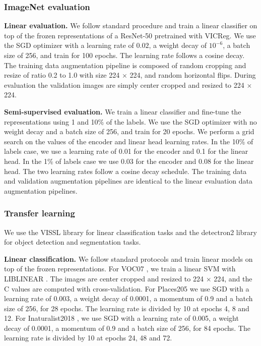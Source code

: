 \documentclass{article}
\newcommand{\algo}{VICReg}
\begin{document}
\subsubsection{ImageNet evaluation} \label{app:eval_imnet}

\textbf{Linear evaluation.} We follow standard procedure and train a linear classifier on top of the frozen representations of a ResNet-50 pretrained with \algo. We use the SGD optimizer with a learning rate of $0.02$, a weight decay of $10^{-6}$, a batch size of 256, and train for 100 epochs. The learning rate follows a cosine decay. The training data augmentation pipeline is composed of random cropping and resize of ratio 0.2 to 1.0 with size 224 $\times$ 224, and random horizontal flips. During evaluation the validation images are simply center cropped and resized to 224 $\times$ 224.

\textbf{Semi-supervised evaluation.} We train a linear classifier and fine-tune the representations using 1 and 10\% of the labels. We use the SGD optimizer with no weight decay and a batch size of 256, and train for 20 epochs. We perform a grid search on the values of the encoder and linear head learning rates. In the 10\% of labels case, we use a learning rate of 0.01 for the encoder and 0.1 for the linear head. In the 1\% of labels case we use 0.03 for the encoder and 0.08 for the linear head. The two learning rates follow a cosine decay schedule. The training data and validation augmentation pipelines are identical to the linear evaluation data augmentation pipelines.

\subsubsection{Transfer learning} \label{app:transfer_other}

We use the VISSL library \cite{goyal2021vissl} for linear classification tasks and the detectron2 library \cite{wu2019detectron2} for object detection and segmentation tasks.

\textbf{Linear classification.} We follow standard protocols \cite{misra2020pirl, caron2020swav, zbontar2021barlow} and train linear models on top of the frozen representations. For VOC07 \cite{everingham2010voc}, we train a linear SVM with LIBLINEAR \cite{fan2008liblinear}. The images are center cropped and resized to 224 $\times$ 224, and the C values are computed with cross-validation. For Places205 \cite{zhou2014places} we use SGD with a learning rate of 0.003, a weight decay of 0.0001, a momentum of 0.9 and a batch size of 256, for 28 epochs. The learning rate is divided by 10 at epochs 4, 8 and 12. For Inaturalist2018 \cite{vanhorni2018naturalist}, we use SGD with a learning rate of 0.005, a weight decay of 0.0001, a momentum of 0.9 and a batch size of 256, for 84 epochs. The learning rate is divided by 10 at epochs 24, 48 and 72.
\end{document}
